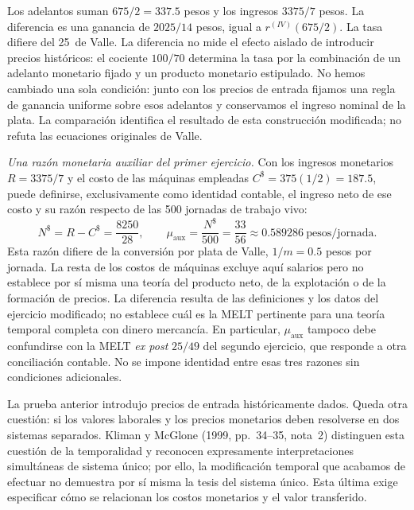 \documentclass[10pt,twoside]{article}
\newcommand{\pct}{\ifmmode\text{\char37}\else\char37\fi}
\begin{document}
Los adelantos suman $675/2=337.5$ pesos y los ingresos $3375/7$ pesos. La diferencia es una ganancia de $2025/14$ pesos, igual a $r^{(IV)}(675/2)$. La tasa difiere del 25\,\pct{} de Valle. La diferencia no mide el efecto aislado de introducir precios históricos: el cociente $100/70$ determina la tasa por la combinación de un adelanto monetario fijado y un producto monetario estipulado. No hemos cambiado una sola condición: junto con los precios de entrada fijamos una regla de ganancia uniforme sobre esos adelantos y conservamos el ingreso nominal de la plata. La comparación identifica el resultado de esta construcción modificada; no refuta las ecuaciones originales de Valle.

\noindent\textit{Una razón monetaria auxiliar del primer ejercicio.} Con los ingresos monetarios $R=3375/7$ y el costo de las máquinas empleadas $C^{\$}=375(1/2)=187.5$, puede definirse, exclusivamente como identidad contable, el ingreso neto de ese costo y su razón respecto de las 500 jornadas de trabajo vivo:
\begin{equation}
N^{\$}=R-C^{\$}=\frac{8250}{28},\qquad
\mu_{\mathrm{aux}}=\frac{N^{\$}}{500}=\frac{33}{56}\approx0.589286\ \text{pesos/jornada}.
\label{eq:mu_aux_iv}
\end{equation}
Esta razón difiere de la conversión por plata de Valle, $1/m=0.5$ pesos por jornada. La resta de los costos de máquinas excluye aquí salarios pero no establece por sí misma una teoría del producto neto, de la explotación o de la formación de precios. La diferencia resulta de las definiciones y los datos del ejercicio modificado; no establece cuál es la MELT pertinente para una teoría temporal completa con dinero mercancía. En particular, $\mu_{\mathrm{aux}}$ tampoco debe confundirse con la MELT \emph{ex post} $25/49$ del segundo ejercicio, que responde a otra conciliación contable. No se impone identidad entre esas tres razones sin condiciones adicionales.

La prueba anterior introdujo precios de entrada históricamente dados. Queda otra cuestión: si los valores laborales y los precios monetarios deben resolverse en dos sistemas separados. Kliman y McGlone (1999, pp.~34--35, nota~2) distinguen esta cuestión de la temporalidad y reconocen expresamente interpretaciones simultáneas de sistema único; por ello, la modificación temporal que acabamos de efectuar no demuestra por sí misma la tesis del sistema único. Esta última exige especificar cómo se relacionan los costos monetarios y el valor transferido.
\end{document}
